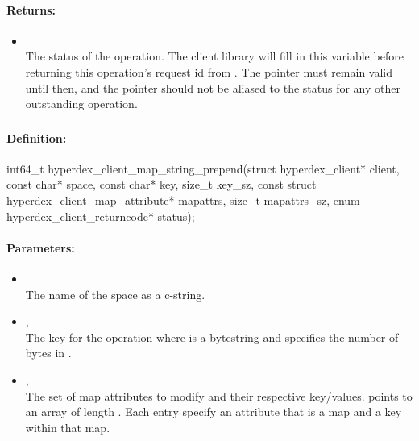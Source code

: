 \paragraph{Returns:}
\begin{itemize}[noitemsep]
\item {}\\
The status of the operation.  The client library will fill in this variable before returning this operation's request id from .  The pointer must remain valid until then, and the pointer should not be aliased to the status for any other outstanding operation.
\end{itemize}

\pagebreak
\subsubsection{}
\label{api:c:map_string_prepend}


\paragraph{Definition:}
\begin{ccode}
int64_t hyperdex_client_map_string_prepend(struct hyperdex_client* client,
        const char* space,
        const char* key, size_t key_sz,
        const struct hyperdex_client_map_attribute* mapattrs, size_t mapattrs_sz,
        enum hyperdex_client_returncode* status);
\end{ccode}

\paragraph{Parameters:}
\begin{itemize}[noitemsep]
\item {}\\
The name of the space as a c-string.
\item {}, \\
The key for the operation where  is a bytestring and  specifies the number of bytes in .
\item {}, \\
The set of map attributes to modify and their respective key/values.   points to an array of length .  Each entry specify an attribute that is a map and a key within that map.
\end{itemize}

